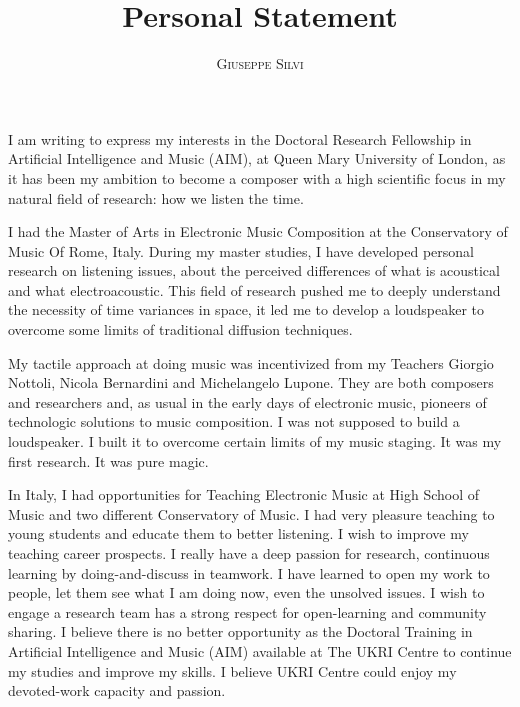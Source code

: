 \documentclass[
	12pt,
	a4paper,
	]{article}
\title{Personal Statement} %
\author{%
\textsc{Giuseppe Silvi}\\[1ex]%
}
\date{} %
\begin{document}
\maketitle
\thispagestyle{empty}
%
I am writing to express my interests in the Doctoral Research Fellowship in Artificial Intelligence and Music (AIM), at Queen Mary University of London, as it has been my ambition to become a composer with a high scientific focus in my natural field of research: how we listen the time.

I had the Master of Arts in Electronic Music Composition at the Conservatory of Music Of Rome, Italy. During my master studies, I have developed personal research on listening issues, about the perceived differences of what is acoustical and what electroacoustic. This field of research pushed me to deeply understand the necessity of time variances in space, it led me to develop a loudspeaker to overcome some limits of traditional diffusion techniques.

My tactile approach at doing music was incentivized from my Teachers Giorgio Nottoli, Nicola Bernardini and Michelangelo Lupone. They are both composers and researchers and, as usual in the early days of electronic music, pioneers of technologic solutions to music composition. I was not supposed to build a loudspeaker. I built it to overcome certain limits of my music staging. It was my first research. It was pure magic.

In Italy, I had opportunities for Teaching Electronic Music at High School of Music and two different Conservatory of Music. I had very pleasure teaching to young students and educate them to better listening. I wish to improve my teaching career prospects. I really have a deep passion for research, continuous learning by doing-and-discuss in teamwork. I have learned to open my work to people, let them see what I am doing now, even the unsolved issues. I wish to engage a research team has a strong respect for open-learning and community sharing. I believe there is no better opportunity as the Doctoral Training in Artificial Intelligence and Music (AIM) available at The UKRI Centre to continue my studies and improve my skills. I believe UKRI Centre could enjoy my devoted-work capacity and passion.
\end{document}
